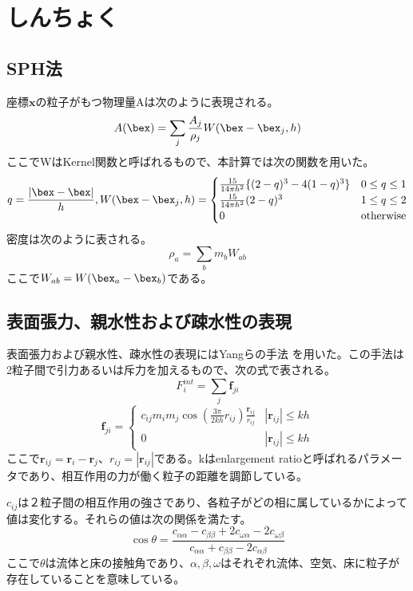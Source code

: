 \documentclass[]{jsarticle}
\begin{document}
\section{しんちょく}
\subsection{SPH法}
座標$\bm{x}$の粒子がもつ物理量Aは次のように表現される。 \cite{Becker}
\begin{equation}
A(\bex)=\sum_j \frac{A_j}{\rho_j} W(\bex-\bex_j,h)
\end{equation}
ここでWはKernel関数と呼ばれるもので、本計算では次の関数を用いた。
\begin{equation}
  q=\frac{|\bex-\bex|}{h}, 
  W(\bex-\bex_j,h)=\begin{cases}
    \frac{15}{14\pi h^2} \{(2-q)^3-4(1-q)^3\} & \text{$ 0 \leq q \leq 1$}\\
    \frac{15}{14\pi h^2} (2-q)^3 & \text{$1\leq q \leq 2$}\\
    0 & \text{otherwise}
\end{cases}
\end{equation}
密度は次のように表される。
\begin{equation}
\rho_{a}=\sum_bm_bW_{ab}
\end{equation}
ここで$W_{ab}=W(\bex_a-\bex_b)$である。
\subsection{表面張力、親水性および疎水性の表現}
表面張力および親水性、疎水性の表現にはYangらの手法 \cite{Yang}を用いた。この手法は2粒子間で引力あるいは斥力を加えるもので、次の式で表される。
\begin{equation}
F^{int}_i=\sum_{j} \bm{f}_{ji}
\end{equation}
\begin{equation}
  \bm{f}_{ji}=\begin{cases}
    c_{ij}m_im_j\cos(\frac{3\pi}{2kh}r_{ij})\frac{\bm{r}_{ij}}{r_{ij}} & \text{$|\bm{r}_{ij}|\leq kh$}\\
    0 & \text{$|\bm{r}_{ij}|\leq kh$}
\end{cases}
\end{equation}
ここで$\bm{r}_{ij}=\bm{r}_i-\bm{r}_{j}$、$r_{ij}=|\bm{r}_{ij}|$である。kはenlargement ratioと呼ばれるパラメータであり、相互作用の力が働く粒子の距離を調節している。

$c_{ij}$は２粒子間の相互作用の強さであり、各粒子がどの相に属しているかによって値は変化する。それらの値は次の関係を満たす。
\begin{equation}
\cos\theta=\frac{c_{\alpha\alpha}-c_{\beta\beta}+2c_{\omega\alpha}-2c_{\omega\beta}}{c_{\alpha\alpha} +c_{\beta\beta} -2c_{\alpha\beta}}
\end{equation}
ここで$\theta$は流体と床の接触角であり、$\alpha,\beta,\omega$はそれぞれ流体、空気、床に粒子が存在していることを意味している。
\end{document}
